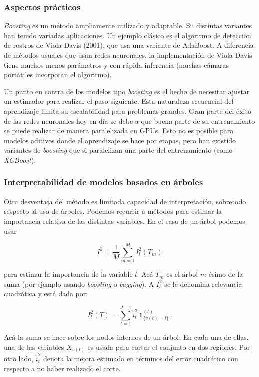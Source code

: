 \subsubsection{Aspectos prácticos}

\textit{Boosting} es un método ampliamente utilizado y adaptable. Su distintas variantes han tenido variadas aplicaciones. Un ejemplo clásico es el algoritmo de detección de rostros de Viola-Davis (2001), que usa una variante de AdaBoost. A diferencia de métodos usuales que usan redes neuronales, la implementación de Viola-Davis tiene muchos menos parámetros y con rápida inferencia (muchas cámaras portátiles incorporan el algoritmo).

Un punto en contra de los modelos tipo \textit{boosting} es el hecho de necesitar ajustar un estimador para realizar el paso siguiente. Esta naturaleza secuencial del aprendizaje limita su escalabilidad para problemas grandes. Gran parte del éxito de las redes neuronales hoy en día se debe a que buena parte de su entrenamiento se puede realizar de manera paralelizada en GPUs. Esto no es posible para modelos aditivos donde el aprendizaje se hace por etapas, pero han existido variantes de \textit{boosting} que si paralelizan una parte del entrenamiento (como \textit{XGBoost}).


\subsubsection{Interpretabilidad de modelos basados en árboles}

Otra desventaja del método es limitada capacidad de interpretación, sobretodo respecto al uso de árboles. Podemos recurrir a métodos para estimar la importancia relativa de las distintas variables. En el caso de un árbol podemos usar

\begin{equation}
    I^2 = \frac{1}{M} \sum^M_{m=1} I^2_l (T_m)
\end{equation}

para estimar la importancia de la variable $l$. Acá $T_m$ es el árbol $m$-ésimo de la suma (por ejemplo usando \textit{boosting} o \textit{bagging}). A $I^2_l$ se le denomina relevancia cuadrática y está dada por:

\begin{equation}
    I^2_l (T) = \sum^{J-1}_{t=1} \hat i^2_t \, \mathbf{1}^{(t)}_{\{ v(t) = l \}} \,.
\end{equation}

Acá la suma se hace sobre los nodos internos de un árbol. En cada una de ellas, una de las variables $X_{v(t)}$ es usada para cortar el conjunto en dos regiones. Por otro lado, $\hat i_t^2$ denota la mejora estimada en términos del error cuadrático con respecto a no haber realizado el corte.


